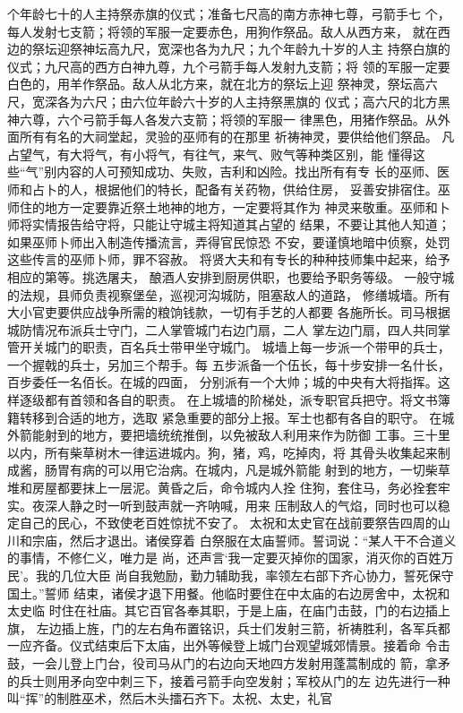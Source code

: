 \documentclass[12pt,UTF8]{ctexbook}
\begin{document}
个年龄七十的人主持祭赤旗的仪式；准备七尺高的南方赤神七尊，弓箭手七 
个，每人发射七支箭；将领的军服一定要赤色，用狗作祭品。敌人从西方来， 
就在西边的祭坛迎祭神坛高九尺，宽深也各为九尺；九个年龄九十岁的人主 
持祭白旗的仪式；九尺高的西方白神九尊，九个弓箭手每人发射九支箭；将 
领的军服一定要白色的，用羊作祭品。敌人从北方来，就在北方的祭坛上迎 
祭神灵，祭坛高六尺，宽深各为六尺；由六位年龄六十岁的人主持祭黑旗的 
仪式；高六尺的北方黑神六尊，六个弓箭手每人各发六支箭；将领的军服一 
律黑色，用猪作祭品。从外面所有有名的大祠堂起，灵验的巫师有的在那里 
祈祷神灵，要供给他们祭品。 
凡占望气，有大将气，有小将气，有往气，来气、败气等种类区别，能 
懂得这些“气”别内容的人可预知成功、失败，吉利和凶险。找出所有有专 
长的巫师、医师和占卜的人，根据他们的特长，配备有关药物，供给住房， 
妥善安排宿住。巫师住的地方一定要靠近祭土地神的地方，一定要将其作为 
神灵来敬重。巫师和卜师将实情报告给守将，只能让守城主将知道其占望的 
结果，不要让其他人知道；如果巫师卜师出入制造传播流言，弄得官民惊恐 
不安，要谨慎地暗中侦察，处罚这些传言的巫师卜师，罪不容赦。 
将贤大夫和有专长的种种技师集中起来，给予相应的第等。挑选屠夫， 
酿酒人安排到厨房供职，也要给予职务等级。 
一般守城的法规，县师负责视察堡垒，巡视河沟城防，阻塞敌人的道路， 
修缮城墙。所有大小官吏要供应战争所需的粮饷钱款，一切有手艺的人都要 
各施所长。司马根据城防情况布派兵士守门，二人掌管城门右边门扇，二人 
掌左边门扇，四人共同掌管开关城门的职责，百名兵士带甲坐守城门。 
城墙上每一步派一个带甲的兵士，一个握戟的兵士，另加三个帮手。每 
五步派备一个伍长，每十步安排一名什长，百步委任一名佰长。在城的四面， 
分别派有一个大帅；城的中央有大将指挥。这样逐级都有首领和各自的职责。 
在上城墙的阶梯处，派专职官兵把守。将文书簿籍转移到合适的地方，选取 
紧急重要的部分上报。军士也都有各自的职守。 
在城外箭能射到的地方，要把墙统统推倒，以免被敌人利用来作为防御 
工事。三十里以内，所有柴草树木一律运进城内。狗，猪，鸡，吃掉肉，将 
其骨头收集起来制成酱，肠胃有病的可以用它治病。在城内，凡是城外箭能 
射到的地方，一切柴草堆和房屋都要抹上一层泥。黄昏之后，命令城内人拴 
住狗，套住马，务必拴套牢实。夜深人静之时一听到鼓声就一齐呐喊，用来 
压制敌人的气焰，同时也可以稳定自己的民心，不致使老百姓惊扰不安了。 
太祝和太史官在战前要祭告四周的山川和宗庙，然后才退出。诸侯穿着 
白祭服在太庙誓师。誓词说：“某人干不合道义的事情，不修仁义，唯力是 
尚，还声言‘我一定要灭掉你的国家，消灭你的百姓万民’。我的几位大臣 
尚自我勉励，勤力辅助我，率领左右部下齐心协力，誓死保守国土。”誓师 
结束，诸侯才退下用餐。他临时要住在中太庙的右边房舍中，太祝和太史临 
时住在社庙。其它百官各奉其职，于是上庙，在庙门击鼓，门的右边插上旗， 
左边插上旌，门的左右角布置铭识，兵士们发射三箭，祈祷胜利，各军兵都 
一应齐备。仪式结束后下太庙，出外等候登上城门台观望城郊情景。接着命 
令击鼓，一会儿登上门台，役司马从门的右边向天地四方发射用蓬蒿制成的 
箭，拿矛的兵士则用矛向空中刺三下，接着弓箭手向空发射；军校从门的左 
边先进行一种叫“挥”的制胜巫术，然后木头擂石齐下。太祝、太史，礼官 
\end{document}
